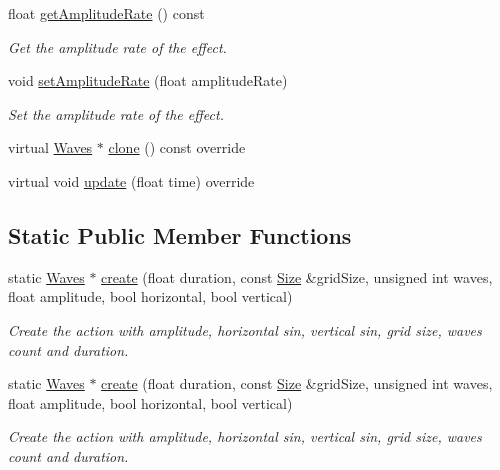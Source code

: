 \begin{DoxyCompactItemize}
float \hyperlink{classWaves_a5271ab00aa35799011e605b51949c8b7}{get\+Amplitude\+Rate} () const
\begin{DoxyCompactList}\small\item\em Get the amplitude rate of the effect. \end{DoxyCompactList}\item 
void \hyperlink{classWaves_abe89b564eea8d77f5e008218bcb48ccb}{set\+Amplitude\+Rate} (float amplitude\+Rate)
\begin{DoxyCompactList}\small\item\em Set the amplitude rate of the effect. \end{DoxyCompactList}\item 
virtual \hyperlink{classWaves}{Waves} $\ast$ \hyperlink{classWaves_a9da6486c1749a9e6cb8966a45897a077}{clone} () const override
\item 
virtual void \hyperlink{classWaves_a06c3576ea3fb412c15103d68c8df9b4b}{update} (float time) override
\end{DoxyCompactItemize}
\subsection*{Static Public Member Functions}
\begin{DoxyCompactItemize}
\item 
static \hyperlink{classWaves}{Waves} $\ast$ \hyperlink{classWaves_ab4b1b0ab15c6f81c3c251bf4f36a7fe0}{create} (float duration, const \hyperlink{classSize}{Size} \&grid\+Size, unsigned int waves, float amplitude, bool horizontal, bool vertical)
\begin{DoxyCompactList}\small\item\em Create the action with amplitude, horizontal sin, vertical sin, grid size, waves count and duration. \end{DoxyCompactList}\item 
static \hyperlink{classWaves}{Waves} $\ast$ \hyperlink{classWaves_ac7642553e533d9b10014e514c04f8e29}{create} (float duration, const \hyperlink{classSize}{Size} \&grid\+Size, unsigned int waves, float amplitude, bool horizontal, bool vertical)
\begin{DoxyCompactList}\small\item\em Create the action with amplitude, horizontal sin, vertical sin, grid size, waves count and duration. \end{DoxyCompactList}\end{DoxyCompactItemize}
